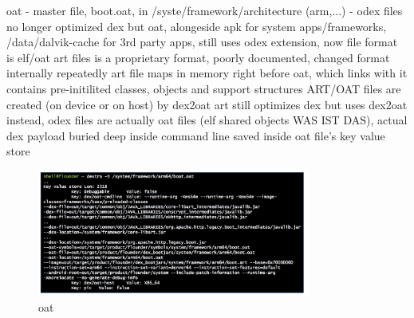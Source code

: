 oat - master file, boot.oat, in /syste/framework/architecture (arm,...) - odex files no longer optimized dex but oat, alongeside apk for system apps/frameworks, /data/dalvik-cache for 3rd party apps, still uses odex extension, now file format is elf/oat\newline
art files is a proprietary format, poorly documented, changed format internally repeatedly
art file maps in memory right before oat, which links with it
contains pre-initilited classes, objects and support structures\newline
ART/OAT files are created (on device or on host) by dex2oat
art still optimizes dex but uses dex2oat instead, odex files are actually oat files (elf shared objects WAS IST DAS), actual dex payload buried deep inside
command line saved inside oat file's key value store
\begin{figure}[h]
    \centering
    \includegraphics[width=0.8\textwidth]{data/oat.png}
    \caption{oat}
    \label{fig:oat}
\end{figure}
\newline

